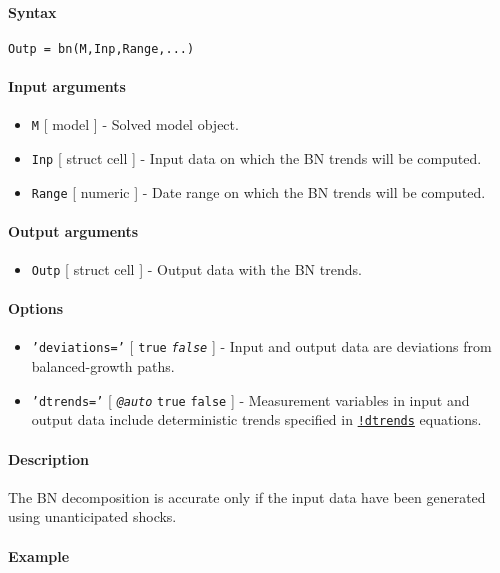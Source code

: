 


	\paragraph{Syntax}\label{syntax}

\begin{verbatim}
Outp = bn(M,Inp,Range,...)
\end{verbatim}

\paragraph{Input arguments}\label{input-arguments}

\begin{itemize}
\item
  \texttt{M} {[} model {]} - Solved model object.
\item
  \texttt{Inp} {[} struct \textbar{} cell {]} - Input data on which the
  BN trends will be computed.
\item
  \texttt{Range} {[} numeric {]} - Date range on which the BN trends
  will be computed.
\end{itemize}

\paragraph{Output arguments}\label{output-arguments}

\begin{itemize}
\itemsep1pt\parskip0pt
\item
  \texttt{Outp} {[} struct \textbar{} cell {]} - Output data with the BN
  trends.
\end{itemize}

\paragraph{Options}\label{options}

\begin{itemize}
\item
  \texttt{'deviations='} {[} \texttt{true} \textbar{}
  \emph{\texttt{false}} {]} - Input and output data are deviations from
  balanced-growth paths.
\item
  \texttt{'dtrends='} {[} \emph{\texttt{@auto}} \textbar{} \texttt{true}
  \textbar{} \texttt{false} {]} - Measurement variables in input and
  output data include deterministic trends specified in
  \href{modellang/dtrends}{\texttt{!dtrends}} equations.
\end{itemize}

\paragraph{Description}\label{description}

The BN decomposition is accurate only if the input data have been
generated using unanticipated shocks.

\paragraph{Example}\label{example}


